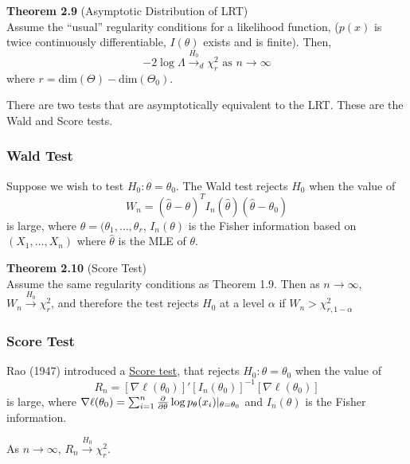 \documentclass[12pt]{article}
\newcommand{\sumn}{\sum_{i=1}^n}
\numberwithin{equation}{section}
\begin{document}
\textbf{Theorem 2.9} (Asymptotic Distribution of LRT) \\
Assume the “usual” regularity conditions for a likelihood function, ($p(x)$ is twice continuously differentiable, $I(\theta)$ exists and is finite).
Then,
\begin{equation*}
  -2 \log \Lambda \overset{H_0}{\to}_d \chi^2_r \text{ as } n \to \infty
\end{equation*}
where $r = \text{dim}(\Theta) - \text{dim}(\Theta_0)$.

There are two tests that are asymptotically equivalent to the LRT. These are the Wald and Score tests.

\subsubsection{Wald Test}
Suppose we wish to test $H_0: \theta = \theta_0$. The Wald test rejects $H_0$ when the value of 
\begin{equation*}
  W_n = (\hat{\theta} - \theta)^T I_n(\hat{\theta}) (\hat{\theta} - \theta_0)
\end{equation*}
is large, where $\theta = (\theta_1, \ldots, \theta_r$, $I_n(\theta)$ is the Fisher information based on $(X_1, \ldots, X_n)$ where $\hat{\theta}$ is the MLE of $\theta$. 


\textbf{Theorem 2.10} (Score Test) \\
Assume the same regularity conditions as Theorem 1.9. Then as $n \to \infty$, $W_n \overset{H_0}{\to} \chi^2_r$, and therefore the test rejects $H_0$ at a level $\alpha$ if $W_n > \chi^2_{r, 1 - \alpha}$

\subsubsection{Score Test}

Rao (1947) introduced a \underline{Score test}, that rejects 
$H_0:  \theta = \theta_0$ when the value of
\begin{equation*}
  R_n = [\nabla \ell(\theta_0)]' [I_n(\theta_0)]^{-1} [\nabla \ell(\theta_0)]
\end{equation*}
is large, where $\nabla \ell(\theta_0) = \sumn \pdv{}{\theta} \log p_{\theta}(x_i) |_{\theta = \theta_0}$ and $I_n(\theta)$ is the Fisher information.

As $n \to \infty$, $R_n \overset{H_0}{\to} \chi^2_r$.
\end{document}
